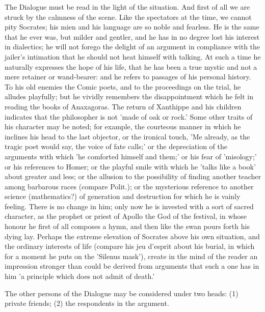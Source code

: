 The Dialogue must be read in the light of the situation. And first of all
we are struck by the calmness of the scene. Like the spectators at the
time, we cannot pity Socrates; his mien and his language are so noble and
fearless. He is the same that he ever was, but milder and gentler, and he
has in no degree lost his interest in dialectics; he will not forego the
delight of an argument in compliance with the jailer's intimation that he
should not heat himself with talking. At such a time he naturally
expresses the hope of his life, that he has been a true mystic and not a
mere retainer or wand-bearer: and he refers to passages of his personal
history. To his old enemies the Comic poets, and to the proceedings on the
trial, he alludes playfully; but he vividly remembers the disappointment
which he felt in reading the books of Anaxagoras. The return of Xanthippe
and his children indicates that the philosopher is not 'made of oak or
rock.' Some other traits of his character may be noted; for example, the
courteous manner in which he inclines his head to the last objector, or
the ironical touch, 'Me already, as the tragic poet would say, the voice
of fate calls;' or the depreciation of the arguments with which 'he
comforted himself and them;' or his fear of 'misology;' or his references
to Homer; or the playful smile with which he 'talks like a book' about
greater and less; or the allusion to the possibility of finding another
teacher among barbarous races (compare Polit.); or the mysterious
reference to another science (mathematics?) of generation and destruction
for which he is vainly feeling. There is no change in him; only now he is
invested with a sort of sacred character, as the prophet or priest of
Apollo the God of the festival, in whose honour he first of all composes a
hymn, and then like the swan pours forth his dying lay. Perhaps the
extreme elevation of Socrates above his own situation, and the ordinary
interests of life (compare his jeu d'esprit about his burial, in which for
a moment he puts on the 'Silenus mask'), create in the mind of the reader
an impression stronger than could be derived from arguments that such a
one has in him 'a principle which does not admit of death.'

The other persons of the Dialogue may be considered under two heads: (1)
private friends; (2) the respondents in the argument.

